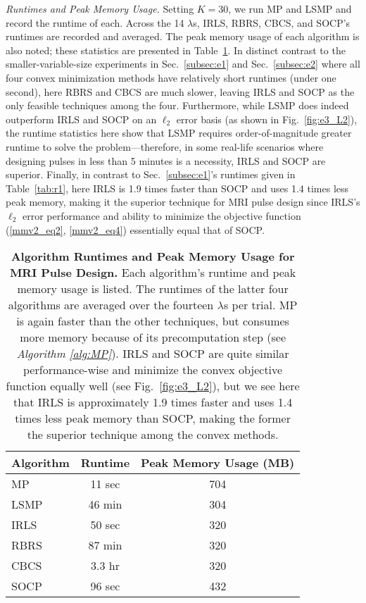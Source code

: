 \documentclass[final]{siamltex}
\begin{document}
   {\em{Runtimes and Peak Memory Usage}.} Setting $K=30$, we run MP
   and LSMP and record the runtime of each.  Across the 14 $\lambda$s,
   IRLS, RBRS, CBCS, and SOCP's runtimes are recorded and averaged.
   The peak memory usage of each algorithm is also noted; these
   statistics are presented in Table~\ref{tab:r3}.  In distinct
   contrast to the smaller-variable-size experiments in
   Sec.~\ref{subsec:e1} and Sec.~\ref{subsec:e2} where all four convex
   minimization methods have relatively short runtimes (under one
   second), here RBRS and CBCS are much slower, leaving IRLS and SOCP
   as the only feasible techniques among the four.  Furthermore, while
   LSMP does indeed outperform IRLS and SOCP on an $\ell_2$ error
   basis (as shown in Fig.~\ref{fig:e3_L2}), the runtime statistics
   here show that LSMP requires order-of-magnitude greater runtime to
   solve the problem---therefore, in some real-life scenarios where
   designing pulses in less than 5 minutes is a necessity, IRLS and
   SOCP are superior.  Finally, in contrast to Sec.~\ref{subsec:e1}'s
   runtimes given in Table~\ref{tab:r1}, here IRLS is 1.9 times faster
   than SOCP and uses 1.4 times less peak memory, making it the
   superior technique for MRI pulse design since IRLS's $\ell_2$ error
   performance and ability to minimize the objective function
   (\ref{mmv2_eq2}, \ref{mmv2_eq4}) essentially equal that of SOCP\@.
   \begin{table}
   \begin{center}
   \small
   \begin{tabular}{|l|c|c|}
   \hline
    {\bf{Algorithm}}   & {\bf{Runtime}} & {\bf{Peak Memory Usage (MB)}} \\ \hline
    MP               & 11 sec            & 704      \\
    LSMP             & 46 min            & 304      \\
    IRLS             & 50 sec            & 320      \\
    RBRS             & 87 min            & 320      \\
    CBCS             & 3.3 hr            & 320      \\
    SOCP             & 96 sec            & 432      \\ \hline
   \end{tabular}
   \end{center}

   \caption{{\bf{Algorithm Runtimes and Peak Memory Usage for MRI
   Pulse Design.}}  Each algorithm's runtime and peak memory usage is
   listed.  The runtimes of the latter four algorithms are averaged
   over the fourteen $\lambda$s per trial.  MP is again faster than
   the other techniques, but consumes more memory because of its
   precomputation step (see {\em{Algorithm \ref{alg:MP}}}).  IRLS and
   SOCP are quite similar performance-wise and minimize the convex
   objective function equally well (see Fig.~\ref{fig:e3_L2}), but we
   see here that IRLS is approximately 1.9 times faster and uses 1.4
   times less peak memory than SOCP, making the former the superior
   technique among the convex methods.}  \label{tab:r3}

   \end{table}
\end{document}
